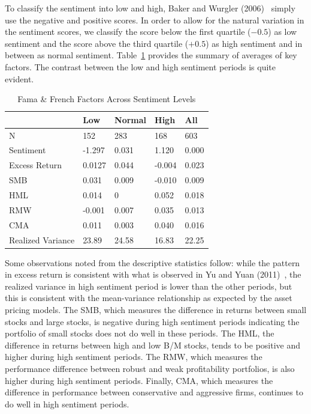 To classify the sentiment into low and high, Baker and Wurgler (2006)~\cite{baker2006investor} simply use the negative and positive scores. In order to allow for the natural variation in the sentiment scores, we classify the score below the first quartile ($-0.5$) as low sentiment and the score above the third quartile ($+0.5$) as high sentiment and in between as normal sentiment. Table~\ref{tab:famafrench} provides the summary of averages of key factors. The contrast between the low and high sentiment periods is quite evident.


        \begin{table}[!ht]
        \centering
        \caption{Fama \& French Factors Across Sentiment Levels \label{tab:famafrench}}
        \begin{tabular}{lllll}
        & Low &     Normal      & High & All \\ \hline
        N & 152 &  283  & 168 & 603 \\
        Sentiment & -1.297 &  0.031  & 1.120 & 0.000 \\
        Excess Return & 0.0127 &  0.044  & -0.004 & 0.023 \\ 
        SMB & 0.031 &  0.009  & -0.010 & 0.009 \\
        HML & 0.014 & 0 & 0.052 & 0.018 \\
        RMW & -0.001 &  0.007  & 0.035& 0.013 \\
        CMA & 0.011 &  0.003  & 0.040 & 0.016 \\
        Realized Variance & 23.89 &  24.58  & 16.83 & 22.25
        \end{tabular}
        \end{table}


Some observations noted from the descriptive statistics follow: while the pattern in excess return is consistent with what is observed in Yu and Yuan (2011)~\cite{yuyuan}, the realized variance in high sentiment period is lower than the other periods, but this is consistent with the mean-variance relationship as expected by the asset pricing models. The SMB, which measures the difference in returns between small stocks and large stocks, is negative during high sentiment periods indicating the portfolio of small stocks does not do well in these periods. The HML, the difference in returns between high and low B/M stocks, tends to be positive and higher during high sentiment periods. The RMW, which measures the performance difference between robust and weak profitability portfolios, is also higher during high sentiment periods. Finally, CMA, which measures the difference in performance between conservative and aggressive firms, continues to do well in high sentiment periods.


